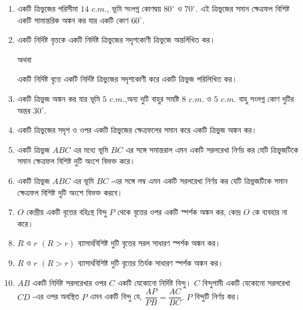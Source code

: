 \documentclass[11pt, a4paper]{article}
\begin{document}
\begin{enumerate}

	\item \textbengali{একটি ত্রিভুজের পরিসীমা} $14$ $c.m.$, \textbengali{ভূমি সংলগ্ন কোণদ্বয় } $80^{ \circ} $ \textbengali{ও}  $70^{\circ} $. \textbengali{এই ত্রিভুজের সমান ক্ষেত্রফল বিশিষ্ট একটি সামান্তরিক অঙ্কন কর যার একটি কোণ} $ 60^{\circ} $. 
	
	\item \textbengali{একটি নির্দিষ্ট বৃত্তকে একটি নির্দিষ্ট ত্রিভুজের সদৃশকোণী ত্রিভুজে অন্তর্লিখিত  কর।} \begin{center}
	\textbengali{অথবা}
	\end{center}
	\textbengali{একটি নির্দিষ্ট বৃত্তে একটি নির্দিষ্ট ত্রিভুজের সদৃশকোণী করে একটি ত্রিভুজ পরিলিখিত কর।}
	
	\item \textbengali{একটি ত্রিভুজ অঙ্কন কর যার ভূমি} $ 5$ $ c.m. $,\textbengali{অন্য দুটি বাহুর সমষ্টি} $ 8 $ $c.m. $ \textbengali{ও} $ 5 $ $ c.m. $ \textbengali{বাহু সংলগ্ন কোণ দুটির অন্তর} $ 30^{\circ} $.

	\item \textbengali{একটি ত্রিভুজের সদৃশ ও ওপর একটি ত্রিভুজের ক্ষেত্রফলের সমান করে একটি ত্রিভুজ অঙ্কন কর।}
	
	\item \textbengali{একটি ত্রিভুজ} $ABC$ \textbengali{এর মধ্যে ভূমি} $BC$ \textbengali{এর সঙ্গে সমান্তরাল এমন একটি সরলরেখা নির্ণয় কর যেটি ত্রিভুজটিকে সমান ক্ষেত্রফল বিশিষ্ট দুটি অংশে বিভক্ত করে।}
	
	\item \textbengali{একটি ত্রিভুজ} $ABC$ \textbengali{এর ভূমি} $BC$ \textbengali{-এর সঙ্গে লম্ব এমন একটি সরলরেখা নির্ণয় কর যেটি ত্রিভুজটিকে সমান ক্ষেত্রফল বিশিষ্ট দুটি অংশে বিভক্ত করবে।}
	
	\item $O$ \textbengali{কেন্দ্রীয় একটি বৃত্তের বহিঃস্থ বিন্দু} $P$ \textbengali{থেকে বৃত্তের ওপর একটি স্পর্শক অঙ্কন কর, কেন্দ্র} $O$ \textbengali{কে ব্যবহার না করে।}
	
	\item $R$ \textbengali{ও} $r$ $(R > r)$ \textbengali{ব্যাসার্ধবিশিষ্ট দুটি বৃত্তের সরল সাধারণ স্পর্শক অঙ্কন কর।} 
	
	\item $R$ \textbengali{ও} $r$ $(R > r)$ \textbengali{ব্যাসার্ধবিশিষ্ট দুটি বৃত্তের তির্যক সাধারণ স্পর্শক অঙ্কন কর।} 
	
	\item $AB$ \textbengali{একটি নির্দিষ্ট সরলরেখার ওপর} $C$ \textbengali{একটি যেকোনো নির্দিষ্ট বিন্দু।} $C$ \textbengali{বিন্দুগামী একটি যেকোনো সরলরেখা} $CD$ \textbengali{-এর ওপর অবস্থিত} $P$ \textbengali{এমন একটি বিন্দু যে, } $\dfrac{AP}{PB} = \dfrac{AC}{BC}.$ $P$ \textbengali{বিন্দুটি নির্ণয় কর।}
	

\end{enumerate}
\end{document}
